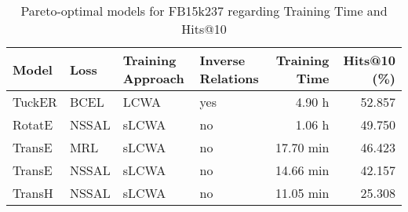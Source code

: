 \begin{table}[H]
\centering
\caption{Pareto-optimal models for FB15k237 regarding Training Time and Hits@10}
\label{tab:skyline_fb15k237_training_time}
\begin{tabular}{llllrr}
\toprule
 Model &  Loss & Training Approach & Inverse Relations & Training Time &  Hits@10 (\%) \\
\midrule
TuckER &  BCEL &              LCWA &               yes &        4.90 h &       52.857 \\
RotatE & NSSAL &             sLCWA &                no &        1.06 h &       49.750 \\
TransE &   MRL &             sLCWA &                no &     17.70 min &       46.423 \\
TransE & NSSAL &             sLCWA &                no &     14.66 min &       42.157 \\
TransH & NSSAL &             sLCWA &                no &     11.05 min &       25.308 \\
\bottomrule
\end{tabular}
\end{table}

